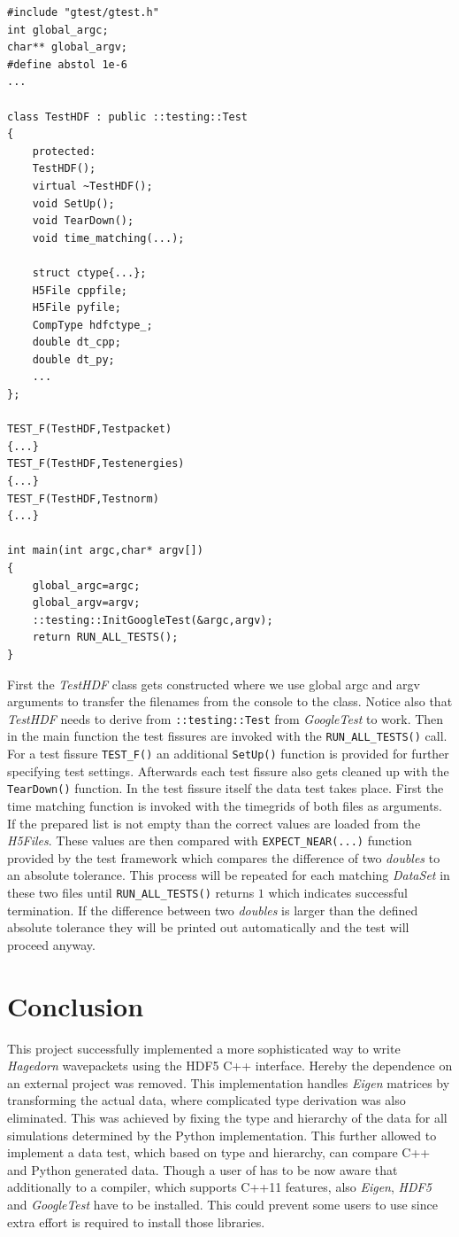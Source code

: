 \begin{lstlisting}
#include "gtest/gtest.h"
int global_argc;
char** global_argv;
#define abstol 1e-6
...

class TestHDF : public ::testing::Test
{
	protected:
	TestHDF();
	virtual ~TestHDF();
	void SetUp();
	void TearDown();
	void time_matching(...);
	
	struct ctype{...};
	H5File cppfile;
	H5File pyfile;
	CompType hdfctype_;
	double dt_cpp;
	double dt_py;
	...
};

TEST_F(TestHDF,Testpacket)
{...}
TEST_F(TestHDF,Testenergies)
{...}
TEST_F(TestHDF,Testnorm)
{...}

int main(int argc,char* argv[])
{
	global_argc=argc;
	global_argv=argv;
	::testing::InitGoogleTest(&argc,argv);
	return RUN_ALL_TESTS();
}
\end{lstlisting}
First the \textit{TestHDF} class gets constructed where we use global argc and argv arguments to transfer the filenames from the console to the class. Notice also that \textit{TestHDF} needs to derive from \texttt{::testing::Test} from \textit{GoogleTest} to work. Then in the main function the test fissures are invoked with the \texttt{RUN\_ALL\_TESTS()} call. For a test fissure \texttt{TEST\_F()} an additional \texttt{SetUp()} function is provided for further specifying test settings. Afterwards each test fissure also gets cleaned up with the \texttt{TearDown()} function. In the test fissure itself the data test takes place. First the time matching function is invoked with the timegrids of both files as arguments. If the prepared list is not empty than the correct values are loaded from the \textit{H5Files}. These values are then compared with \texttt{EXPECT\_NEAR(...)} function provided by the test framework which compares the difference of two \textit{doubles} to an absolute tolerance. This process will be repeated for each matching \textit{DataSet} in these two files until \texttt{RUN\_ALL\_TESTS()} returns $1$ which indicates successful termination. If the difference between two \textit{doubles} is larger than the defined absolute tolerance they will be printed out automatically and the test will proceed anyway.

\chapter{Conclusion}
This project successfully implemented a more sophisticated way to write \textit{Hagedorn} wavepackets using the HDF5 C++ interface. Hereby the dependence on an external project \cite{eigen3-hdf5} was removed. This implementation handles \textit{Eigen} matrices by transforming the actual data, where complicated type derivation was also eliminated. This was achieved by fixing the type and hierarchy of the data for all simulations determined by the Python implementation. This further allowed to implement a data test, which based on type and hierarchy, can compare C++ and Python generated data. Though a user of \cite{libwaveblocks} has to be now aware that additionally to a compiler, which supports C++11 features, also \textit{Eigen}, \textit{HDF5} and \textit{GoogleTest} have to be installed. This could prevent some users to use \cite{libwaveblocks} since extra effort is required to install those libraries.


